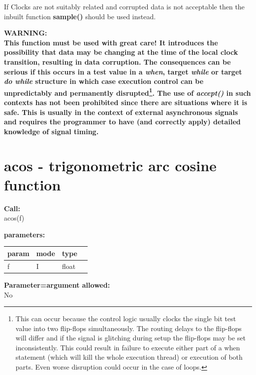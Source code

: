         If Clocks are not suitably related and corrupted data is not acceptable
        then the inbuilt function {\bf sample()}  should be used
        instead.
        
        {\bf WARNING:} \\
        {\bf This function must be used with great care! It introduces the
        possibility that data may be changing at the time of the local clock
        transition, resulting in data corruption. The consequences can be
        serious if this occurs in a test value in a {\em when}, target {\em
        while} or target {\em do while} structure in which case execution
        control can be unpredictably and permanently disrupted\footnote{This can
        occur because the control logic usually clocks the single bit test value
        into two flip-flops simultaneously. The routing delays to the flip-flops
        will differ and if the signal is glitching during setup the flip-flops
        may be set inconsistently. This could result in failure to execute
        either part of a when statement (which will kill the whole execution
        thread) or execution of both parts. Even worse disruption could
        occur in the case of loops.}. The use of {\em accept()} in such
        contexts has not been prohibited since there are situations where it is
        safe. This is usually in the context of external asynchronous signals
        and requires the programmer to have (and correctly apply) detailed
        knowledge of signal timing.}


    \section{acos - trigonometric arc cosine function}\label{sec:ifacos}
        
        
        {\bf Call:} \\
        acos(f)
        
        {\bf parameters:} \\
        \begin{tabular}{| l | l | l | l |}
        \hline
        param  & mode & type & \\
        \hline \hline
        f & I & float & \\ \hline
        \end{tabular}
        
        {\bf Parameter=argument allowed:} \\
        No
        
